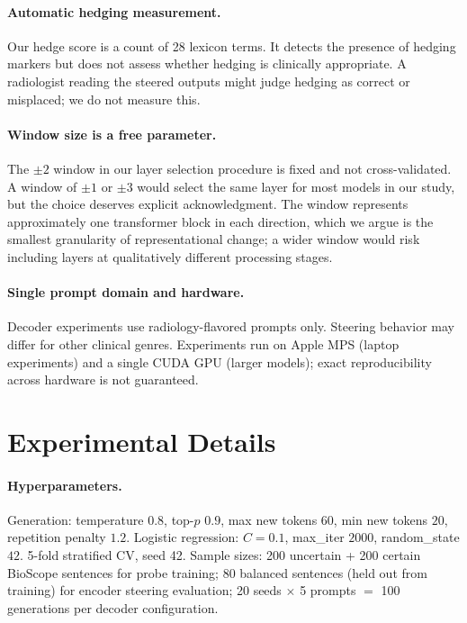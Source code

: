 \documentclass[11pt,a4paper]{article}
\begin{document}
\paragraph{Automatic hedging measurement.}
Our hedge score is a count of 28 lexicon terms. It detects the presence
of hedging markers but does not assess whether hedging is clinically
appropriate. A radiologist reading the steered outputs might judge
hedging as correct or misplaced; we do not measure this.

\paragraph{Window size is a free parameter.}
The $\pm 2$ window in our layer selection procedure is fixed and not
cross-validated. A window of $\pm 1$ or $\pm 3$ would select the same
layer for most models in our study, but the choice deserves explicit
acknowledgment. The window represents approximately one transformer block
in each direction, which we argue is the smallest granularity of
representational change; a wider window would risk including layers at
qualitatively different processing stages.

\paragraph{Single prompt domain and hardware.}
Decoder experiments use radiology-flavored prompts only. Steering
behavior may differ for other clinical genres. Experiments run on Apple
MPS (laptop experiments) and a single CUDA GPU (larger models); exact
reproducibility across hardware is not guaranteed.

\appendix
\section{Experimental Details}
\label{app:details}

\paragraph{Hyperparameters.}
Generation: temperature $0.8$, top-$p$ $0.9$, max new tokens $60$, min
new tokens $20$, repetition penalty $1.2$. Logistic regression: $C=0.1$,
max\_iter $2000$, random\_state $42$. 5-fold stratified CV, seed 42.
Sample sizes: 200 uncertain + 200 certain BioScope sentences for probe
training; 80 balanced sentences (held out from training) for encoder
steering evaluation; 20 seeds $\times$ 5 prompts $=$ 100 generations per
decoder configuration.
\end{document}
